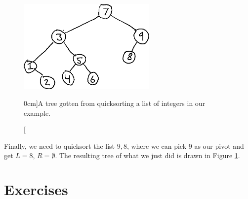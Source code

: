 \documentclass[nobib]{tufte-handout}
\begin{document}
\begin{example}
  \begin{figure}
    \centering
    \includegraphics[width=0.6\textwidth]{graphics/L3_trees/quicksort_tree.png}
    \caption[][0cm]{A tree gotten from quicksorting a list of integers in our example.}
    \label{fig:quicksort_tree}
  \end{figure}

  Finally, we need to quicksort the list $9,8$, where we can pick $9$ as our pivot and get $L = 8$, $R = \emptyset$. The resulting tree of what we just did is drawn in Figure \ref{fig:quicksort_tree}.
\end{example}

\section{Exercises}

%
%
\end{document}
